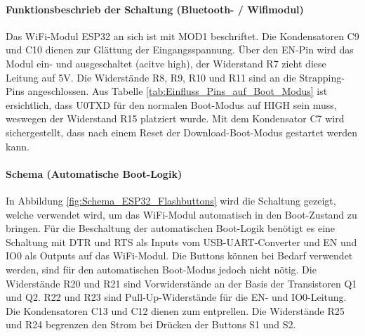 \paragraph{Funktionsbeschrieb der Schaltung (Bluetooth- / Wifimodul)}\mbox{}

Das WiFi-Modul ESP32 an sich ist mit MOD1 beschriftet. Die Kondensatoren C9 und C10 dienen zur Glättung der Eingangsspannung. Über den EN-Pin wird das Modul ein- und ausgeschaltet (acitve high), der Widerstand R7 zieht diese Leitung auf 5V. Die Widerstände R8, R9, R10 und R11 sind an die Strapping-Pins angeschlossen.
Aus Tabelle \ref{tab:Einfluss_Pins_auf_Boot_Modus} ist ersichtlich, dass U0TXD für den normalen Boot-Modus auf HIGH sein muss, weswegen der Widerstand R15 platziert wurde. Mit dem Kondensator C7 wird sichergestellt, dass nach einem Reset der Download-Boot-Modus gestartet werden kann.


\paragraph{Schema (Automatische Boot-Logik)}\mbox{}

In Abbildung \ref{fig:Schema_ESP32_Flashbuttons} wird die Schaltung gezeigt, welche verwendet wird, um das WiFi-Modul automatisch in den Boot-Zustand zu bringen. Für die Beschaltung der automatischen Boot-Logik benötigt es eine Schaltung mit DTR und RTS als Inputs vom USB-UART-Converter und EN und IO0 als Outputs auf das WiFi-Modul. Die Buttons können bei Bedarf verwendet werden, sind für den automatischen Boot-Modus jedoch nicht nötig.
Die Widerstände R20 und R21 sind Vorwiderstände an der Basis der Transistoren Q1 und Q2. R22 und R23 sind Pull-Up-Widerstände für die EN- und IO0-Leitung. Die Kondensatoren C13 und C12 dienen zum entprellen. Die Widerstände R25 und R24 begrenzen den Strom bei Drücken der Buttons S1 und S2.

